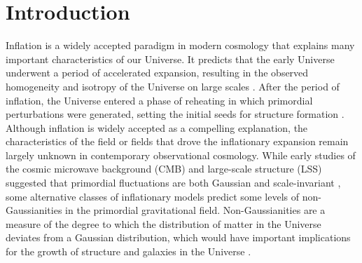 \section{Introduction}
\label{sec:introduction}

Inflation is a widely accepted paradigm in modern cosmology that explains many important characteristics of our Universe. It predicts that the early Universe underwent a period of accelerated expansion, resulting in the observed homogeneity and isotropy of the Universe on large scales \citep[see, e.g.,][for a review]{weinberg2013observational}. After the period of inflation, the Universe entered a phase of reheating in which primordial perturbations were generated, setting the initial seeds for structure formation \citep{kofman1994reheating, bassett2006inflation, lyth2009primordial}. Although inflation is widely accepted as a compelling explanation, the characteristics of the field or fields that drove the inflationary expansion remain largely unknown in contemporary observational cosmology. While early studies of the cosmic microwave background (CMB) and large-scale structure (LSS) suggested that primordial fluctuations are both Gaussian and scale-invariant \citep{PhysRevD.69.103501, guth2005inflationary}, some alternative classes of inflationary models predict some levels of non-Gaussianities in the primordial gravitational field. Non-Gaussianities are a measure of the degree to which the distribution of matter in the Universe deviates from a Gaussian distribution, which would have important implications for the growth of structure and galaxies in the Universe \citep[see, e.g.,][]{2010CQGra..27l4011D, Biagetti2019Galax...7...71B}.

